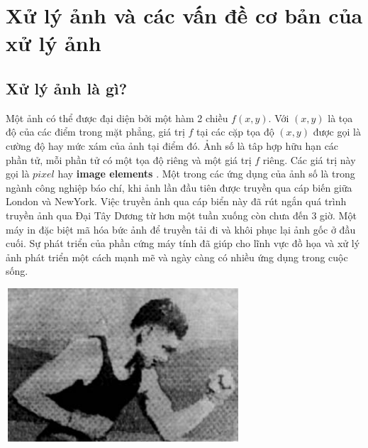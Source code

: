 \documentclass[12pt, oneside, a4paper]{book}
\begin{document}
\chapter{Xử lý ảnh và các vấn đề cơ bản của xử lý ảnh}
\section{Xử lý ảnh là gì?}
Một ảnh có thể được đại diện bởi một hàm 2 chiều $f(x,y)$. Với $(x, y)$ là tọa độ của các điểm trong mặt phẳng, giá trị $f$ tại các cặp tọa độ $(x,y)$ được gọi là cường độ  hay mức xám của ảnh tại điểm đó. Ảnh số là tâp hợp hữu hạn các  phần tử, mỗi phần tử có một tọa độ riêng và một giá trị $f$ riêng. Các giá trị này gọi là $pixel$ hay \textbf{image elements} . Một trong các ứng dụng của ảnh số là trong ngành công nghiệp báo chí, khi ảnh lần đầu tiên được truyền qua cáp biến giữa London và NewYork. Việc truyền ảnh qua cáp biển này đã rút ngắn quá trình truyền ảnh qua Đại Tây Dương từ hơn một tuần xuống còn chưa đến 3 giờ. Một máy in đặc biệt mã hóa bức ảnh để truyền tải đi và khôi phục lại ảnh gốc ở đầu cuối. Sự phát triển của phần cứng máy tính đã giúp cho lĩnh vực đồ họa và xử lý ảnh phát triển một cách mạnh mẽ và ngày càng có nhiều ứng dụng trong cuộc sống.
\begin{center}
\includegraphics[]{figure/1921.png}
\end{center}
\end{document}
